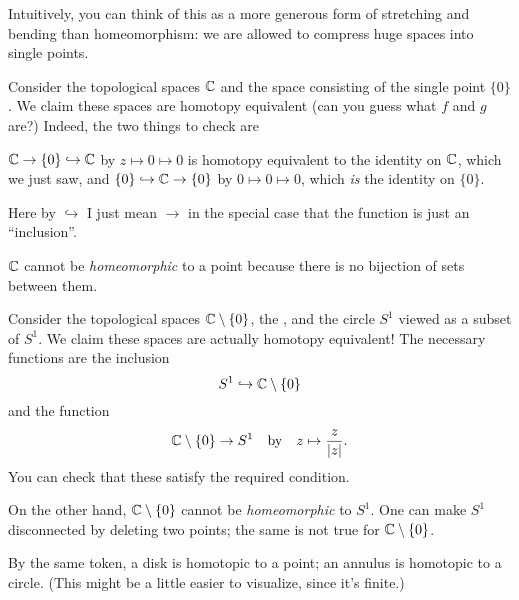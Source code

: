 Intuitively, you can think of this as a more generous form of stretching
and bending than homeomorphism: we are allowed to compress huge spaces into single points.

\begin{example}[$\CC$ is contractible]
	Consider the topological spaces $\CC$
	and the space consisting of the single point $\{0\}$. 
	We claim these spaces are homotopy equivalent (can you guess what $f$ and $g$ are?)
	Indeed, the two things to check are
	\begin{enumerate}[(i)]
		\ii $\mathbb C \to \{0\} \hookrightarrow \mathbb C$ by $z \mapsto 0 \mapsto 0$
		is homotopy equivalent to the identity on $\CC$, which we just saw, and
		\ii $\{0\} \hookrightarrow \mathbb C \to \{0\}$ by $0 \mapsto 0 \mapsto 0$, which \emph{is} the identity on $\{0\}$.
	\end{enumerate}
	Here by $\hookrightarrow$ I just mean $\to$ in the special case
	that the function is just an ``inclusion''.
\end{example}
\begin{remark}
	$\CC$ cannot be \emph{homeomorphic} to a point
	because there is no bijection of sets between them.
\end{remark}

\begin{example}
	Consider the topological spaces $\mathbb C \setminus \{0\}$,
	the , and the circle $S^1$ viewed as a subset of $S^1$.
	We claim these spaces are actually homotopy equivalent!
	The necessary functions are the inclusion
	\[ S^1 \hookrightarrow \mathbb C \setminus \{0\} \]
	and the function
	\[ \mathbb C \setminus \{0\} \to S^1
		\quad\text{by}\quad
		z \mapsto \frac{z}{\left\lvert z \right\rvert}. \]
	You can check that these satisfy the required condition.
\end{example}
\begin{remark}
	On the other hand, $\mathbb C \setminus \{0\}$ cannot be \emph{homeomorphic} to $S^1$.
	One can make $S^1$ disconnected by deleting two points;
	the same is not true for $\mathbb C \setminus \{0\}$.
\end{remark}
\begin{example}
	[$\text{Disk} = \text{Point}$, $\text{Annulus} = \text{Circle}$.]
	By the same token, a disk is homotopic to a point;
	an annulus is homotopic to a circle.
	(This might be a little easier to visualize, since it's finite.)
\end{example}

